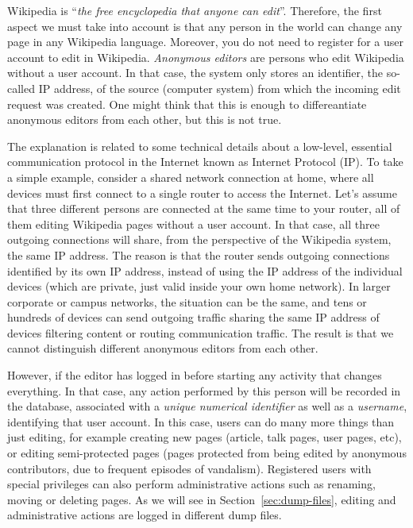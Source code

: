 Wikipedia is ``\textit{the free encyclopedia that anyone can edit}''. Therefore, the
first aspect we must take into account is that any person in the world can change
any page in any Wikipedia language. Moreover, you do not need to register for
a user account to edit in Wikipedia. \textit{Anonymous editors} are persons who
edit Wikipedia without a user account. In that case, the system only stores an
identifier, the so-called IP address, of the source (computer system) from 
which the incoming edit request was created. One might think that this is 
enough to differeantiate anonymous editors from each other, but this is not true. 

The explanation is related to some technical details about a low-level, essential 
communication protocol in the Internet known as Internet Protocol (IP). To take
a simple example, consider a shared network connection at home, where all devices
must first connect to a single router to access the Internet. Let's assume
that three different persons are connected at the same time to your router,
all of them editing Wikipedia pages without a user account. In that case, all three
outgoing connections will share, from the perspective of the Wikipedia system, 
the same IP address. The reason is that the router sends outgoing connections identified
by its own IP address, instead of using the IP address of the individual devices
(which are private, just valid inside your own home network). In larger corporate
or campus networks, the situation can be the same, and tens or hundreds of devices
can send outgoing traffic sharing the same IP address of devices filtering content
or routing communication traffic. The result is that we cannot distinguish different
anonymous editors from each other.

However, if the editor has logged in before starting any activity that changes everything.
In that case, any action performed by this person will be recorded in the database,
associated with a \textit{unique numerical identifier} as well as a \textit{username},
identifying that user account. In this case, users can do many more things than
just editing, for example creating new pages (article, talk pages, user pages, etc), or
editing semi-protected pages (pages protected from being edited by anonymous contributors,
due to frequent episodes of vandalism). Registered users with special privileges can
also perform administrative actions such as renaming, moving or deleting pages. As we
will see in Section~\ref{sec:dump-files}, editing and administrative actions are
logged in different dump files. 


